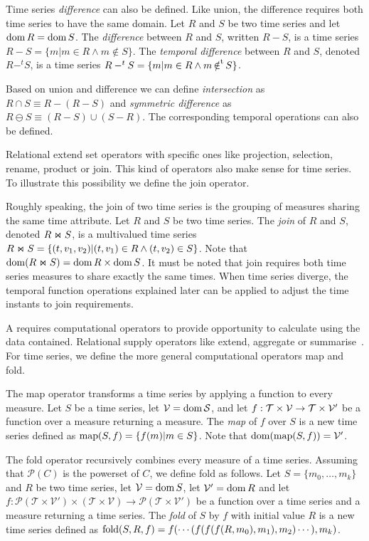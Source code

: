 Time series \emph{difference} can also be defined. Like union, the
difference requires both time series to have the same domain.
%
Let $R$ and $S$ be two time series and let $\operatorname{dom} R = \operatorname{dom} S$.
%
The \emph{difference} between $R$ and $S$, written $R-S$, is a time
series $R-S=\{m|m\in R\wedge m\notin S\}$.
%
The \emph{temporal difference} between $R$ and $S$, denoted $R-^t S$, 
is a time series $R-^t S=\{m|m\in R\wedge m \operatorname*{\notin^t} S\}$.


Based on union and difference we can define \emph{intersection} as
$R\cap S \equiv R - (R - S)$ and \emph{symmetric difference}
as $R \ominus S \equiv (R - S) \cup (S - R)$. The
corresponding temporal operations can also be defined.


Relational  extend set operators with specific ones like
projection, selection, rename, product or join. This kind of operators
also make sense for time series. To illustrate this possibility we
define the join operator.

Roughly speaking, the join of two time series is the grouping of
measures sharing the same time attribute.  Let $R$ and $S$ be two time
series.  The \emph{join} of $R$ and $S$, denoted $R \Join S$, is a
multivalued time series $R \Join S = \{ (t,v_1,v_2) | (t,v_1) \in
R\wedge (t,v_2) \in S\}$. Note that $\operatorname{dom}(R\Join
S)=\operatorname{dom} R\times\operatorname{dom} S$.
%
It must be noted that join requires both time series measures to share
exactly the same times. When time series diverge, the temporal
function operations explained later can be applied to adjust the time
instants to join requirements.


A  requires computational operators to provide opportunity
to calculate using the data contained. Relational  supply
operators like extend, aggregate or
summarise~\cite{date:introduction}. For time series, we define the more
general computational operators map and fold.

The map operator transforms a time series by applying a function to
every measure.  Let $S$ be a time series, let $\cal{V}=\operatorname{dom} S$, and
let $f:\cal{T}\times\cal{V}\rightarrow\cal{T}\times\cal{V'}$ be a
function over a measure returning a measure. The \emph{map} of $f$
over $S$ is a new time series defined as $\operatorname*{map}(S,f)=\{f(m)|m\in
S\}$. Note that $\operatorname{dom}(\operatorname*{map}(S,f))=\cal{V'}$.
%


The fold operator recursively combines every measure of a time
series. Assuming that $\mathcal{P}(C)$ is the powerset of $C$, we
define fold as follows.
%
Let $S=\{m_0,\dots, m_k\}$ and $R$ be two time series, let
$\mathcal{V}=\operatorname{dom} S$, let $\mathcal{V'}=\operatorname{dom} R$ and let 
%
$f:\mathcal{P}(\mathcal{T}\times\mathcal{V'}) \times (\mathcal{T}\times\mathcal{V}) \rightarrow \mathcal{P}(\mathcal{T}\times\mathcal{V'})$ 
%
be a function over a time series and a measure returning a time
series.
%
The \emph{fold} of $S$ by $f$ with initial value $R$ is a new time
series defined as $\operatorname*{fold}(S,R,f) = f(\cdots(f(f(f(R,m_0),\allowbreak
m_1),\allowbreak m_2)\cdots),\allowbreak m_k)$.
%



